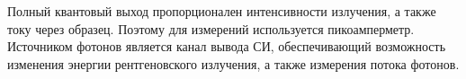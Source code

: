 Полный квантовый выход пропорционален интенсивности излучения, а так­же
току через образец. Поэтому для измерений используется пикоамперметр.
Источником фотонов является канал вывода СИ, обеспечивающий возможность
изменения энергии рентгеновского излучения, а также измерения потока фото­нов.



